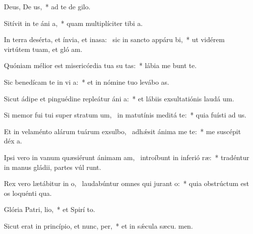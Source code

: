 \item Deus, De us,~* ad te de  gilo.
\item Sitívit in te áni a,~* quam multiplíciter tibi  a.
\item In terra desérta, et ínvia, et inasa:~\pscross{} sic in sancto appáru bi,~* ut vidérem virtútem tuam, et gló am.
\item Quóniam mélior est misericórdia tua su tas:~* lábia me bunt te.
\item Sic benedícam te in vi a:~* et in nómine tuo levábo  as.
\item Sicut ádipe et pinguédine repleátur áni a:~* et lábiis exsultatiónis laudá  um.
\item Si memor fui tui super stratum um,~\pscross{} in matutínis meditá  te:~* quia fuísti ad us.
\item Et in velaménto alárum tuárum exsulbo,~\pscross{} adhǽsit ánima me  te:~* me suscépit déx a.
\item Ipsi vero in vanum quæsiérunt ánimam am,~\pscross{} introíbunt in inferió ræ:~* tradéntur in manus gládii, partes vúl runt.
\item Rex vero lætábitur in o,~\pscross{} laudabúntur omnes qui jurant  o:~* quia obstrúctum est os loquénti qua.
\item Glória Patri,  lio,~* et Spirí to.
\item Sicut erat in princípio, et nunc,  per,~* et in sǽcula sæcu. men.
